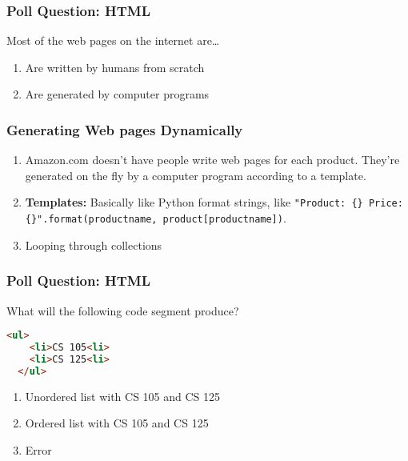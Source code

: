 \documentclass{beamer}
\begin{document}
%
%
\begin{frame}[fragile]
  \frametitle{Poll Question: HTML}
  Most of the web pages on the internet are\ldots
  \begin{enumerate}[A]
    \item Are written by humans from scratch
    \item Are generated by computer programs
  \end{enumerate}
\end{frame}

%
%
\begin{frame}[fragile]
  \frametitle{Generating Web pages Dynamically}
  \begin{enumerate}[A]
    \item Amazon.com doesn't have people write web pages for each product. They're generated on the fly by a computer program according to a template.
    \item \textbf{Templates: } Basically like Python format strings, like \lstinline|"Product: {} Price: {}".format(productname, product[productname])|.
    \item Looping through collections
  \end{enumerate}
\end{frame}

%
%
\begin{frame}[fragile]
  \frametitle{Poll Question: HTML}
  What will the following code segment produce?\\
  \begin{lstlisting}[language=html,autogobble]
  <ul>
    <li>CS 105<li>
    <li>CS 125<li>
  </ul>
  \end{lstlisting} 
  \vfill
  \begin{enumerate}[A]
    \item Unordered list with CS 105 and CS 125
    \item Ordered list with CS 105 and CS 125
    \item Error
  \end{enumerate}
\end{frame}
\end{document}
